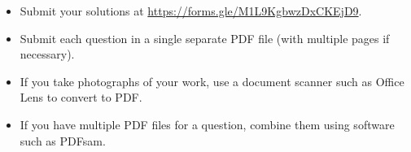 \documentclass{article}
\begin{document}
\vfill
\begin{itemize}
	\item Submit your solutions at \url{https://forms.gle/M1L9KgbwzDxCKEjD9}.
	\item Submit each question in a single separate PDF file (with multiple pages if necessary).
	\item If you take photographs of your work, use a document scanner such as Office Lens to convert to PDF.
	\item If you have multiple PDF files for a question, combine them using software such as PDFsam.
\end{itemize}

\vfill
\centering
\tiny
\begin{BVerbatim}
\end{BVerbatim}
\end{document}
